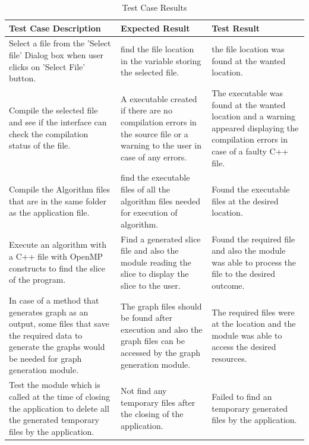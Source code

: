 \documentclass[conference]{IEEEtran}
\begin{document}
\begin{table}[t]
\begin{center}
\begin{tabular}{| p{} | p{} | p{} |}
\hline
    \textbf{Test Case Description} & \textbf{Expected Result} & \textbf{Test Result}  \\
\hline
    Select a file from the 'Select file' Dialog box when user clicks on 'Select File' button. & find the file location in the variable storing the selected file. & the file location was found at the wanted location. \\
\hline
    Compile the selected file and see if the interface can check the compilation status of the file. & A executable created if there are no compilation errors in the source file or a warning to the user in case of any errors. & The executable was found at the wanted location and a warning appeared displaying the compilation errors in case of a faulty C++ file. \\
\hline
    Compile the Algorithm files that are in the same folder as the application file. & find the executable files of all the algorithm files needed for execution of algorithm. & Found the executable files at the desired location.  \\
\hline
    Execute an algorithm with a C++ file with OpenMP constructs to find the slice of the program. & Find a generated slice file and also the module reading the slice to display the slice to the user. & Found the required file and also the module was able to process the file to the desired outcome.\\
\hline
    In case of a method that generates graph as an output, some files that save the required data to generate the graphs would be needed for graph generation module. & The graph files should be found after execution and also the graph files can be accessed by the graph generation module. & The required files were at the location and the module was  able to access the desired resources.\\
\hline
    Test the module which is called at the time of closing the application to delete all the generated temporary files by the application. & Not find any temporary files after the closing of the application. & Failed to find an temporary generated files by the application.\\
\hline
\end{tabular}
\end{center}
\caption{Test Case Results}
\label{tab:template}
\end{table}
\end{document}
